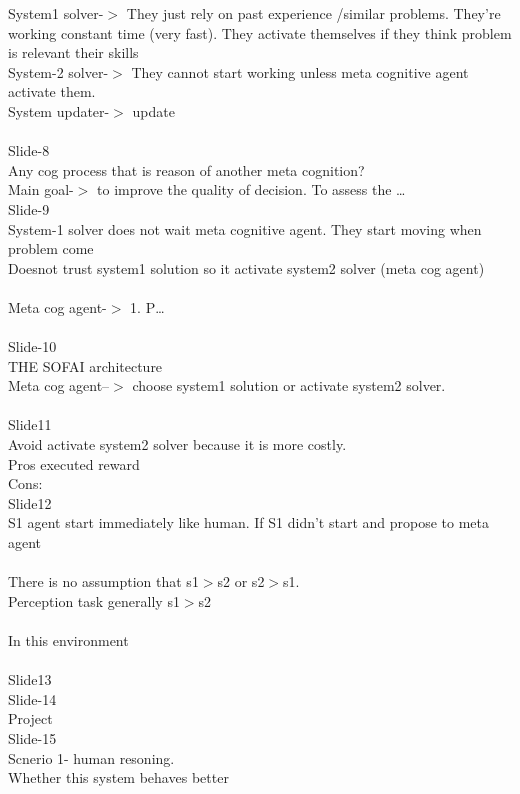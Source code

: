 \documentclass{article}
\begin{document}
System1 solver-$>$ They just rely on past experience /similar problems. They’re working constant time (very fast). They activate themselves if they think problem is relevant their skills \\
System-2 solver-$>$ They cannot start working unless meta cognitive agent activate them.  \\
System updater-$>$ update \\
 \\
Slide-8 \\
Any cog process that is reason of another meta cognition? \\
Main goal-$>$ to improve the quality of decision. To assess the … \\
Slide-9 \\
System-1 solver does not wait meta cognitive agent. They start moving when problem come \\
Doesnot trust system1 solution so it activate system2 solver (meta cog agent) \\
 \\
Meta cog agent-$>$ 1. P… \\
 \\
Slide-10 \\
THE SOFAI architecture \\
Meta cog agent--$>$ choose system1 solution or activate system2 solver. \\
 \\
Slide11 \\
Avoid activate system2 solver because it is more costly.  \\
Pros executed reward \\
Cons: \\
Slide12 \\
S1 agent start immediately like human.  If S1 didn’t start and propose to meta agent  \\
 \\
There is no assumption that s1$>$s2 or s2$>$s1. \\
Perception task generally s1$>$s2 \\
 \\
In this environment \\
 \\
Slide13 \\
Slide-14 \\
Project  \\
Slide-15  \\
Scnerio 1- human resoning. \\
Whether this system behaves better  \\
\end{document}
